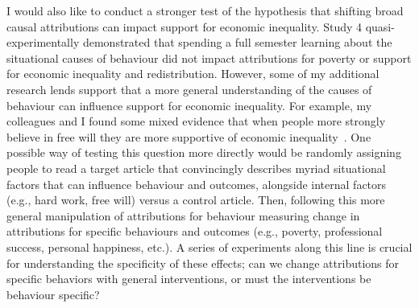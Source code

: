 \documentclass{sfuthesis}
\begin{document}
I would also like to conduct a stronger test of the hypothesis that shifting broad causal attributions can impact support for economic inequality. Study 4 quasi-experimentally demonstrated that spending a full semester learning about the situational causes of behaviour did not impact attributions for poverty or support for economic inequality and redistribution. However, some of my additional research lends support that a more general understanding of the causes of behaviour can influence support for economic inequality. For example, my colleagues and I found some mixed evidence that when people more strongly believe in free will they are more supportive of economic inequality~\cite{mercierunpub}. One possible way of testing this question more directly would be randomly assigning people to read a target article that convincingly describes myriad situational factors that can influence behaviour and outcomes, alongside internal factors (e.g., hard work, free will) versus a control article. Then, following this more general manipulation of attributions for behaviour measuring change in attributions for specific behaviours and outcomes (e.g., poverty, professional success, personal happiness, etc.). A series of experiments along this line is crucial for understanding the specificity of these effects; can we change attributions for specific behaviors with general interventions, or must the interventions be behaviour specific?
\end{document}
